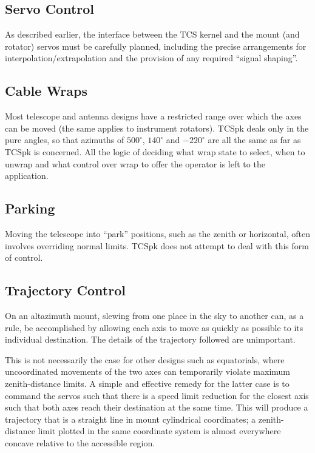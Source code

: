 \documentclass[12pt,fleqn,twoside]{article}
\renewcommand{\_}{{\tt\char'137}}     %
\begin{document}
\subsection{Servo Control}

As described earlier, the interface
between the TCS kernel and the mount (and
rotator) servos must be carefully planned, including the precise
arrangements for interpolation/extrapolation and the provision of
any required ``signal shaping''.

\subsection{Cable Wraps}

Most telescope and antenna designs have a restricted range over
which the axes can be moved (the same applies to instrument
rotators).  TCSpk deals only in the pure angles, so that azimuths
of $500^\circ$, $140^\circ$ and $-220^\circ$ are all
the same as far as TCSpk is concerned.  All the logic of deciding
what wrap state to select, when to unwrap and what control over wrap
to offer the operator is left to the application.

\subsection{Parking}

Moving the telescope into ``park'' positions, such as the zenith or
horizontal, often involves overriding normal limits.  TCSpk does not
attempt to deal with this form of control.

\subsection{Trajectory Control}

On an altazimuth mount, slewing from one place in the sky to another
can, as a rule, be accomplished by allowing each axis to move as
quickly as possible to its individual destination.  The details of the
trajectory followed are unimportant.

This is not
necessarily the case for other designs such as equatorials, where
uncoordinated movements of the two axes can temporarily violate
maximum zenith-distance limits.  A simple and effective
remedy for the latter
case is to command the servos such that there is a speed limit
reduction for the closest axis such that both axes reach their
destination at the same time.  This will produce a trajectory that
is a straight line in mount cylindrical coordinates;  a zenith-distance
limit plotted in the same coordinate system is almost everywhere concave
relative to the accessible region.
\end{document}
